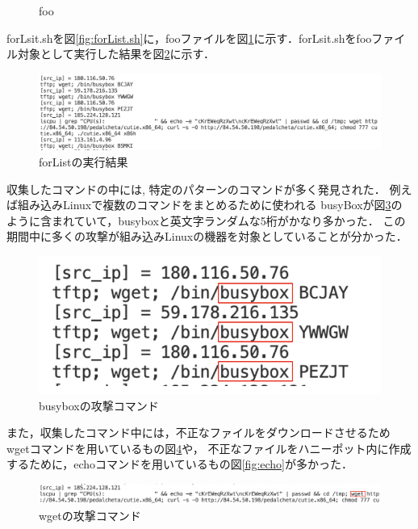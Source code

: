 \documentclass[dvipdfmx]{bta}
\begin{document}
\begin{figure}[htbp]

	
	\caption{foo}\label{fig:foo}
	
\end{figure}

forLsit.shを図\ref{fig:forList.sh}に，fooファイルを図\ref{fig:foo}に示す．forLsit.shをfooファイル対象として実行した結果を図\ref{fig:forresult}に示す．
\begin{figure}[htbp]

	\centering
 	\includegraphics[scale=0.7]{forresult.png}
	\caption{forListの実行結果}\label{fig:forresult}
	
\end{figure}

収集したコマンドの中には,
特定のパターンのコマンドが多く発見された．
例えば組み込みLinuxで複数のコマンドをまとめるために使われる
busyBoxが図\ref{fig:busybox}のように含まれていて，busyboxと英文字ランダムな5桁がかなり多かった．
この期間中に多くの攻撃が組み込みLinuxの機器を対象としていることが分かった．

\begin{figure}[htbp]

	\centering
 	\includegraphics[scale=0.7]{busybox.png}
	\caption{busyboxの攻撃コマンド}\label{fig:busybox}
	
\end{figure}

また，収集したコマンド中には，不正なファイルをダウンロードさせるためwgetコマンドを用いているもの図\ref{fig:wget}や，
不正なファイルをハニーポット内に作成するために，echoコマンドを用いているもの図\ref{fig:echo}が多かった．
\begin{figure}[htbp]

	\centering
 	\includegraphics[scale=0.7]{wget.png}
	\caption{wgetの攻撃コマンド}\label{fig:wget}
	
\end{figure}
\end{document}
